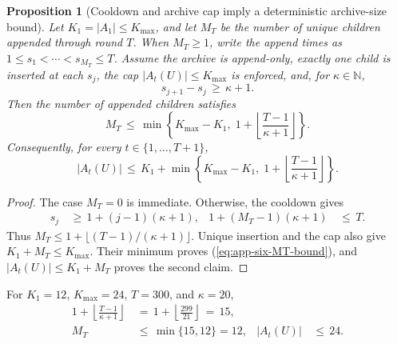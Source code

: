 \documentclass{article} %
\newtheorem{proposition}[theorem]{Proposition}
\renewcommand{\eqref}[1]{\textup{(\ref{#1})}}
\begin{document}
\begin{proposition}[Cooldown and archive cap imply a deterministic archive-size bound]
\label{prop:15}
Let \(K_1=|A_1|\leq K_{\max}\), and let \(M_T\) be the number of unique
children appended through round \(T\). When \(M_T\geq1\), write the append
times as \(1\leq s_1<\cdots<s_{M_T}\leq T\). Assume the archive is append-only,
exactly one child is inserted at each \(s_j\), the cap
\(|A_t(U)|\leq K_{\max}\) is enforced, and, for \(\kappa\in\mathbb N\),
\begin{equation}
\label{eq:app-six-cooldown-condition}
s_{j+1}-s_j\,\geq\,\kappa+1.
\end{equation}
Then the number of appended children satisfies
\begin{equation}
\label{eq:app-six-MT-bound}
M_T
\,\le\,
\min\!\left\{
K_{\max}-K_1,\;
1+\left\lfloor\frac{T-1}{\kappa+1}\right\rfloor
\right\}.
\end{equation}
Consequently, for every \(t\in\{1,\ldots,T+1\}\),
\begin{equation}
\label{eq:app-six-archive-size-bound}
|A_t(U)|
\,\le\,
K_1+
\min\!\left\{
K_{\max}-K_1,\;
1+\left\lfloor\frac{T-1}{\kappa+1}\right\rfloor
\right\}.
\end{equation}
\end{proposition}

\begin{proof}
The case \(M_T=0\) is immediate. Otherwise, the cooldown gives
\begin{equation}
\begin{aligned}
s_j
&\,\ge\,
1+(j-1)(\kappa+1),
&
1+(M_T-1)(\kappa+1)
&\,\le\,
T.
\end{aligned}
\end{equation}
Thus \(M_T\leq1+\lfloor(T-1)/(\kappa+1)\rfloor\). Unique insertion and the
cap also give \(K_1+M_T\leq K_{\max}\). Their minimum proves
\eqref{eq:app-six-MT-bound}, and \(|A_t(U)|\leq K_1+M_T\) proves the second
claim.
\end{proof}

For \(K_1=12\), \(K_{\max}=24\), \(T=300\), and \(\kappa=20\),
\begin{equation}
\begin{aligned}
1+\left\lfloor\frac{T-1}{\kappa+1}\right\rfloor
&\,=\,
1+\left\lfloor\frac{299}{21}\right\rfloor
\,=\,15,
\\
M_T
&\,\leq\,
\min\{15,12\}=12,
&
|A_t(U)|
&\,\leq\,24.
\end{aligned}
\end{equation}
\end{document}
